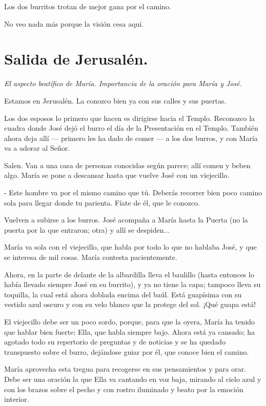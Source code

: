 \documentclass[12pt]{book} %
\begin{document}
Los dos burritos trotan de mejor gana por el camino. 

No veo nada más porque la visión cesa aquí. 

\chapter{Salida de Jerusalén.}
\emph{El aspecto beatífico de María. Importancia de la oración para María y José.}

Estamos en Jerusalén. La conozco bien ya con sus calles y sus puertas. 

Los dos esposos lo primero que hacen es dirigirse hacia el Templo. Reconozco la cuadra donde José dejó el burro el día de la Presentación en el Templo. También ahora deja allí — primero les ha dado de comer — a los dos burros, y con María va a adorar al Señor. 

Salen. Van a una casa de personas conocidas según parece; allí comen y beben algo. María se pone a descansar hasta que vuelve José con un viejecillo. 

- Este hombre va por el mismo camino que tú. Deberás recorrer bien poco camino sola para llegar donde tu parienta. Fíate de él, que le conozco. 

Vuelven a subirse a los burros. José acompaña a María hasta la Puerta (no la puerta por la que entraron; otra) y allí se despiden... 

María va sola con el viejecillo, que habla por todo lo que no hablaba José, y que se interesa de mil cosas. María contesta pacientemente. 

Ahora, en la parte de delante de la albardilla lleva el baulillo (hasta entonces lo había llevado siempre José en su burrito), y ya no tiene la capa; tampoco lleva su toquilla, la cual está ahora doblada encima del baúl. Está guapísima con su vestido azul oscuro y con su velo blanco que la protege del sol. ¡Qué guapa está! 

El viejecillo debe ser un poco sordo, porque, para que la oyera, María ha tenido que hablar bien fuerte; Ella, que habla siempre bajo. Ahora está ya cansado; ha agotado todo su repertorio de preguntas y de noticias y se ha quedado transpuesto sobre el burro, dejándose guiar por él, que conoce bien el camino. 

María aprovecha esta tregua para recogerse en sus pensamientos y para orar. Debe ser una oración la que Ella va cantando en voz baja, mirando al cielo azul y con los brazos sobre el pecho y con rostro iluminado y beato por la emoción interior. 
\end{document}
